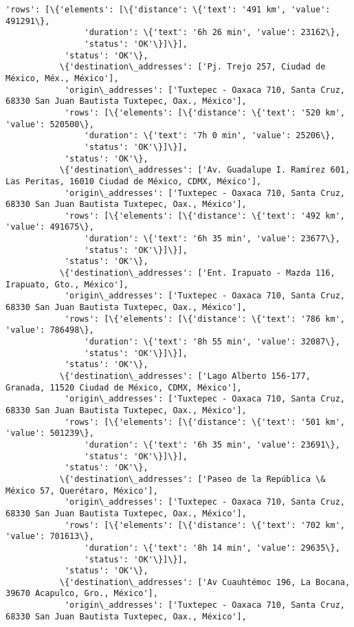\documentclass[11pt]{article}
\begin{document}
\begin{Verbatim}[commandchars=\\\{\}]
            'rows': [\{'elements': [\{'distance': \{'text': '491 km', 'value': 491291\},
                'duration': \{'text': '6h 26 min', 'value': 23162\},
                'status': 'OK'\}]\}],
            'status': 'OK'\},
           \{'destination\_addresses': ['Pj. Trejo 257, Ciudad de México, Méx., México'],
            'origin\_addresses': ['Tuxtepec - Oaxaca 710, Santa Cruz, 68330 San Juan Bautista Tuxtepec, Oax., México'],
            'rows': [\{'elements': [\{'distance': \{'text': '520 km', 'value': 520500\},
                'duration': \{'text': '7h 0 min', 'value': 25206\},
                'status': 'OK'\}]\}],
            'status': 'OK'\},
           \{'destination\_addresses': ['Av. Guadalupe I. Ramírez 601, Las Peritas, 16010 Ciudad de México, CDMX, México'],
            'origin\_addresses': ['Tuxtepec - Oaxaca 710, Santa Cruz, 68330 San Juan Bautista Tuxtepec, Oax., México'],
            'rows': [\{'elements': [\{'distance': \{'text': '492 km', 'value': 491675\},
                'duration': \{'text': '6h 35 min', 'value': 23677\},
                'status': 'OK'\}]\}],
            'status': 'OK'\},
           \{'destination\_addresses': ['Ent. Irapuato - Mazda 116, Irapuato, Gto., México'],
            'origin\_addresses': ['Tuxtepec - Oaxaca 710, Santa Cruz, 68330 San Juan Bautista Tuxtepec, Oax., México'],
            'rows': [\{'elements': [\{'distance': \{'text': '786 km', 'value': 786498\},
                'duration': \{'text': '8h 55 min', 'value': 32087\},
                'status': 'OK'\}]\}],
            'status': 'OK'\},
           \{'destination\_addresses': ['Lago Alberto 156-177, Granada, 11520 Ciudad de México, CDMX, México'],
            'origin\_addresses': ['Tuxtepec - Oaxaca 710, Santa Cruz, 68330 San Juan Bautista Tuxtepec, Oax., México'],
            'rows': [\{'elements': [\{'distance': \{'text': '501 km', 'value': 501239\},
                'duration': \{'text': '6h 35 min', 'value': 23691\},
                'status': 'OK'\}]\}],
            'status': 'OK'\},
           \{'destination\_addresses': ['Paseo de la República \& México 57, Querétaro, México'],
            'origin\_addresses': ['Tuxtepec - Oaxaca 710, Santa Cruz, 68330 San Juan Bautista Tuxtepec, Oax., México'],
            'rows': [\{'elements': [\{'distance': \{'text': '702 km', 'value': 701613\},
                'duration': \{'text': '8h 14 min', 'value': 29635\},
                'status': 'OK'\}]\}],
            'status': 'OK'\},
           \{'destination\_addresses': ['Av Cuauhtémoc 196, La Bocana, 39670 Acapulco, Gro., México'],
            'origin\_addresses': ['Tuxtepec - Oaxaca 710, Santa Cruz, 68330 San Juan Bautista Tuxtepec, Oax., México'],

\end{Verbatim}
\end{document}
